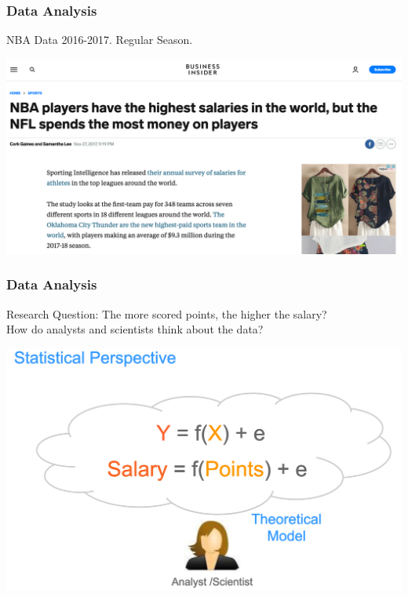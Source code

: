 \documentclass{beamer}
\begin{document}
\begin{frame}
\frametitle{Data Analysis}
NBA Data 2016-2017. Regular Season. 

\begin{center}
\includegraphics[scale=0.25]{./figures/sports.png}
\end{center}

\end{frame}
\begin{frame}
\frametitle{Data Analysis}
Research Question: The more scored points, the higher the salary? \\[10pt]

How do analysts and scientists think about the data?

\begin{center}
\includegraphics[scale=0.25]{./figures/sports_1.png}
\end{center}

\end{frame}
\end{document}
